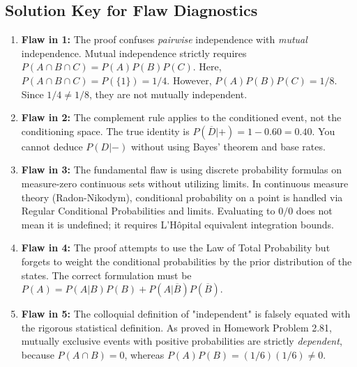 \documentclass[11pt, letterpaper]{article}
\theoremstyle{definition}
\begin{document}
\subsection{Solution Key for Flaw Diagnostics}
\begin{enumerate}
    \item \textbf{Flaw in 1:} The proof confuses \textit{pairwise} independence with \textit{mutual} independence. Mutual independence strictly requires $P(A \cap B \cap C) = P(A)P(B)P(C)$. Here, $P(A \cap B \cap C) = P(\{1\}) = 1/4$. However, $P(A)P(B)P(C) = 1/8$. Since $1/4 \neq 1/8$, they are not mutually independent.
    \item \textbf{Flaw in 2:} The complement rule applies to the conditioned event, not the conditioning space. The true identity is $P(\overline{D}|+) = 1 - 0.60 = 0.40$. You cannot deduce $P(D|-)$ without using Bayes' theorem and base rates.
    \item \textbf{Flaw in 3:} The fundamental flaw is using discrete probability formulas on measure-zero continuous sets without utilizing limits. In continuous measure theory (Radon-Nikodym), conditional probability on a point is handled via Regular Conditional Probabilities and limits. Evaluating to $0/0$ does not mean it is undefined; it requires L'Hôpital equivalent integration bounds.
    \item \textbf{Flaw in 4:} The proof attempts to use the Law of Total Probability but forgets to weight the conditional probabilities by the prior distribution of the states. The correct formulation must be $P(A) = P(A|B)P(B) + P(A|\overline{B})P(\overline{B})$.
    \item \textbf{Flaw in 5:} The colloquial definition of "independent" is falsely equated with the rigorous statistical definition. As proved in Homework Problem 2.81, mutually exclusive events with positive probabilities are strictly \textit{dependent}, because $P(A \cap B) = 0$, whereas $P(A)P(B) = (1/6)(1/6) \neq 0$.
\end{enumerate}
\end{document}
